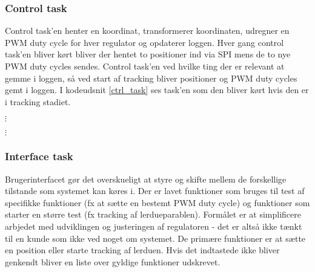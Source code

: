 \subsubsection{Control task}
\label{sec:control_task}
Control task'en henter en koordinat, transformerer koordinaten,
udregner en PWM duty cycle for hver regulator og opdaterer loggen.
Hver gang control task'en bliver kørt bliver der hentet to positioner
ind via SPI mens de to nye PWM duty cycles sendes.
Control task'en ved hvilke ting der er relevant at gemme i loggen,
så ved start af tracking bliver positioner og PWM duty cycles gemt i loggen.
I kodeudsnit \ref{ctrl_task} ses task'en som den bliver kørt hvis den er i tracking stadiet.

\(\vdots\)

\(\vdots\)


\subsubsection{Interface task}
\label{sec:interface}
Brugerinterfacet gør det overskueligt at styre og skifte mellem de forskellige tilstande som systemet kan køres i.
Der er lavet funktioner som bruges til test af specifikke funktioner (fx at sætte en bestemt PWM duty cycle)
og funktioner som starter en større test (fx tracking af lerdueparablen).
Formålet er at simplificere arbjedet med udviklingen og justeringen af regulatoren -
det er altså ikke tænkt til en kunde som ikke ved noget om systemet.
De primære funktioner er at sætte en position eller starte tracking af lerduen.
Hvis det indtastede ikke bliver genkendt bliver en liste over gyldige funktioner udskrevet.

